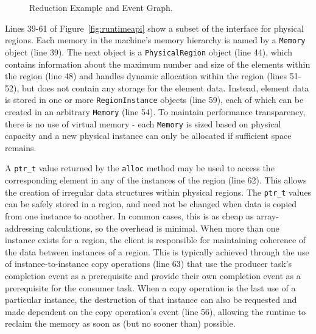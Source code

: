 \begin{figure}
{{
}
}
  \caption{Reduction Example and Event Graph.\label{fig:reducevents}}
  \vspace{-4mm}
\end{figure}

Lines 39-61 of Figure~\ref{fig:runtimeapi} show a subset of the interface for physical regions.  
Each memory in the machine's memory hierarchy is named by a {\tt Memory} object (line 39).
The next object is a {\tt PhysicalRegion} object (line 44), which contains information about the
maximum number and size of the elements within the region (line 48) and handles dynamic allocation
within the region (lines 51-52), but does not contain any storage for the element data.  Instead,
element data is stored in one or more {\tt RegionInstance} objects (line 59), each of which can be
created in an arbitrary {\tt Memory} (line 54).  To maintain performance transparency, there is no
use of virtual memory - each {\tt Memory} is sized based on physical capacity and a new physical
instance can only be allocated if sufficient space remains.

A {\tt ptr\_t} value returned by the {\tt alloc}
method may be used to access the corresponding element in any of the instances of the region (line 62).
This
allows the creation of irregular data structures within physical regions.  The {\tt ptr\_t} values can
be safely stored in a region, and need not be changed when data is copied from one instance to another.
In common cases, this is as cheap as array-addressing calculations, so the overhead is minimal.
When more than one instance exists for a region, the client is responsible for maintaining coherence
of the data between instances of a region.  This is typically achieved through the use of instance-to-instance
copy operations (line 63) that use the producer task's completion event as a prerequisite and provide
their own completion event as a prerequisite for the consumer task.  When a copy operation is
the last use of a particular instance, the destruction of that instance can also be requested and made
dependent on the copy operation's event (line 56), allowing the runtime to reclaim the memory as soon as (but no
sooner than) possible.

